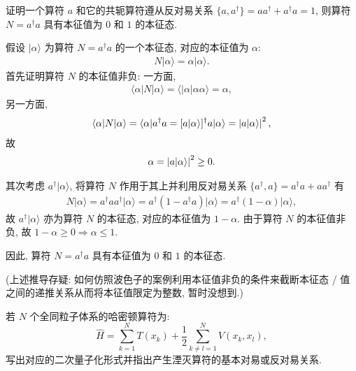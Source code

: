 \documentclass{assignment}
\begin{document}
\begin{prob}[课本习题 7.7]
    证明一个算符 $a$ 和它的共轭算符遵从反对易关系 $\{a,a^{\dagger}\}=aa^{\dagger}+a^{\dagger}a=1$, 则算符 $N=a^{\dagger}a$ 具有本征值为 $0$ 和 $1$ 的本征态.
\end{prob}
\begin{pf}
    假设 $\lvert\alpha\rangle$ 为算符 $N=a^{\dagger}a$ 的一个本征态, 对应的本征值为 $\alpha$:
    \begin{align}
        N\lvert\alpha\rangle=\alpha\lvert\alpha\rangle.
    \end{align}
    首先证明算符 $N$ 的本征值非负: 一方面,
    \begin{align}
        \langle\alpha\rvert N\lvert\alpha\rangle=\langle\rvert\alpha\lvert\alpha\alpha\rangle=\alpha,
    \end{align}
    另一方面,
    \begin{align}
        \langle\alpha\rvert N\lvert\alpha\rangle=\langle\alpha\rvert a^{\dagger}a=[a\lvert\alpha\rangle]^{\dagger}a\lvert\alpha\rangle=\left\lvert a\lvert\alpha\rangle\right\rvert^2,
    \end{align}
    故
    \begin{align}
        \alpha=\left\lvert a\lvert\alpha\rangle\right\rvert^2\geq 0.
    \end{align}

    其次考虑 $a^{\dagger}\lvert\alpha\rangle$, 将算符 $N$ 作用于其上并利用反对易关系 $\{a^{\dagger},a\}=a^{\dagger}a+aa^{\dagger}$ 有
    \begin{align}
        N\lvert\alpha\rangle=a^{\dagger}aa^{\dagger}\lvert\alpha\rangle=a^{\dagger}(1-a^{\dagger}a)\lvert\alpha\rangle=a^{\dagger}(1-\alpha)\lvert\alpha\rangle,
    \end{align}
    故 $a^{\dagger}\lvert\alpha\rangle$ 亦为算符 $N$ 的本征态, 对应的本征值为 $1-\alpha$. 由于算符 $N$ 的本征值非负, 故 $1-\alpha\geq 0\Longrightarrow\alpha\leq 1$.

    因此, 算符 $N=a^{\dagger}a$ 具有本征值为 $0$ 和 $1$ 的本征态.

    (上述推导存疑: 如何仿照波色子的案例利用本征值非负的条件来截断本征态 / 值之间的递推关系从而将本征值限定为整数, 暂时没想到.)
\end{pf}

\begin{prob}
    若 $N$ 个全同粒子体系的哈密顿算符为:
    \[
        \hat{H}=\sum_{k=1}^NT(x_k)+\frac{1}{2}\sum_{k\neq l=1}^NV(x_k,x_l),
    \]
    写出对应的二次量子化形式并指出产生湮灭算符的基本对易或反对易关系.
\end{prob}
\begin{sol}

\end{sol}
\end{document}

